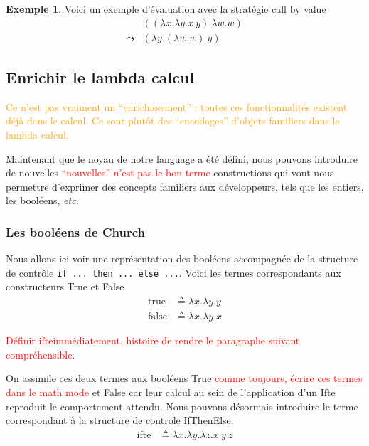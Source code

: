 \documentclass {article}
\theoremstyle{definition}
\newtheorem{example}{Exemple}
\theoremstyle{remark}
\newcommand{\todo}[1]{\textcolor{red}{#1}}
\newcommand{\attention}[1]{\textcolor{orange}{#1}}
\newcommand{\etc}{\textit{etc.}}
\begin{document}
\begin{example}
  Voici un exemple d'évaluation avec la stratégie call by value
  \begin{align*}
    & ((\lambda x.\lambda y. x\: y)\: \lambda w.w)  \\
    \leadsto & (\lambda y. (\lambda w.w)\: y) 
  \end{align*}
\end{example}





\subsection{Enrichir le lambda calcul}

\attention{Ce n'est pas vraiment un ``enrichissement'' : toutes ces
  fonctionnalités existent déjà dans le calcul. Ce sont plutôt des
  ``encodages'' d'objets familiers dans le lambda calcul.}

Maintenant que le noyau de notre language a été défini, nous pouvons
introduire de nouvelles \todo{``nouvelles'' n'est pas le bon terme}
constructions qui vont nous permettre d'exprimer des concepts
familiers aux développeurs, tels que les entiers, les booléens, \etc

\subsubsection{Les booléens de Church}

\newcommand{\True}{\ensuremath{\mathrm{true}}}
\newcommand{\False}{\ensuremath{\mathrm{false}}}
\newcommand{\Ifte}{\ensuremath{\mathrm{ifte}}}

Nous allons ici voir une représentation des booléens accompagnée de la 
structure de contrôle \texttt{if ... then ... else ...}.
Voici les termes correspondants aux constructeurs True et False
\begin{align*}
  \True &\triangleq \lambda x.\lambda y. y  \\
  \False &\triangleq \lambda x.\lambda y. x
\end{align*}

\todo{Définir \Ifte immédiatement, histoire de rendre le paragraphe suivant compréhensible.}

On assimile ces deux termes aux booléens True \todo{comme toujours, écrire ces termes dans le math mode} et False car leur calcul au sein
de l'application d'un Ifte reproduit le comportement attendu.
Nous pouvons désormais introduire le terme correspondant à la structure de 
controle IfThenElse.
\begin{align*}
  \Ifte &\triangleq \lambda x.\lambda y.\lambda z. x\: y\: z  \\
\end{align*}
\end{document}
